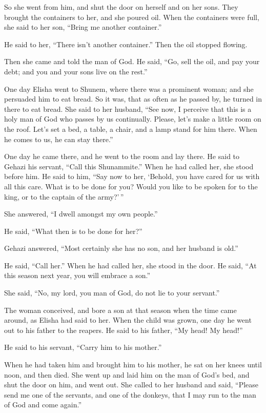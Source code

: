  So she went from him, and shut the door on herself and on
her sons. They brought the containers to her, and she poured oil.
 When the containers were full, she said to her son, ``Bring
me another container.''

He said to her, ``There isn't another container.'' Then the oil stopped
flowing.

 Then she came and told the man of God. He said, ``Go, sell
the oil, and pay your debt; and you and your sons live on the rest.''

 One day Elisha went to Shunem, where there was a prominent
woman; and she persuaded him to eat bread. So it was, that as often as
he passed by, he turned in there to eat bread.  She said to
her husband, ``See now, I perceive that this is a holy man of God who
passes by us continually.  Please, let's make a little room
on the roof. Let's set a bed, a table, a chair, and a lamp stand for him
there. When he comes to us, he can stay there.''

 One day he came there, and he went to the room and lay
there.  He said to Gehazi his servant, ``Call this
Shunammite.'' When he had called her, she stood before him.
 He said to him, ``Say now to her, `Behold, you have cared
for us with all this care. What is to be done for you? Would you like to
be spoken for to the king, or to the captain of the army?'\,''

She answered, ``I dwell amongst my own people.''

 He said, ``What then is to be done for her?''

Gehazi answered, ``Most certainly she has no son, and her husband is
old.''

 He said, ``Call her.'' When he had called her, she stood
in the door.  He said, ``At this season next year, you will
embrace a son.''

She said, ``No, my lord, you man of God, do not lie to your servant.''

 The woman conceived, and bore a son at that season when
the time came around, as Elisha had said to her.  When the
child was grown, one day he went out to his father to the reapers.
 He said to his father, ``My head! My head!''

He said to his servant, ``Carry him to his mother.''

 When he had taken him and brought him to his mother, he
sat on her knees until noon, and then died.  She went up
and laid him on the man of God's bed, and shut the door on him, and went
out.  She called to her husband and said, ``Please send me
one of the servants, and one of the donkeys, that I may run to the man
of God and come again.''

